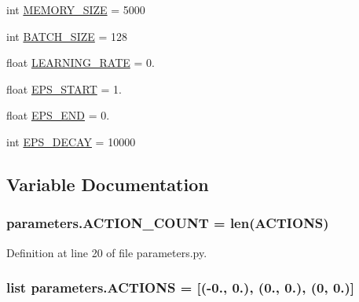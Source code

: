 \begin{DoxyCompactItemize}
\item 
int \hyperlink{namespaceparameters_a49f1ad074b5710a98fc783c5627ddade}{M\+E\+M\+O\+R\+Y\+\_\+\+S\+I\+ZE} = 5000
\item 
int \hyperlink{namespaceparameters_a2d37d9950f7a887014021ab455282af6}{B\+A\+T\+C\+H\+\_\+\+S\+I\+ZE} = 128
\item 
float \hyperlink{namespaceparameters_afb996d542e8c3d3e8bbdfe4a711694dd}{L\+E\+A\+R\+N\+I\+N\+G\+\_\+\+R\+A\+TE} = 0.
\item 
float \hyperlink{namespaceparameters_a371d0de003e9046dcc72450b7512ce14}{E\+P\+S\+\_\+\+S\+T\+A\+RT} = 1.
\item 
float \hyperlink{namespaceparameters_a3765f189d3af4815766ded3bffcba1e2}{E\+P\+S\+\_\+\+E\+ND} = 0.
\item 
int \hyperlink{namespaceparameters_ab9a88c663385563b35331bbea5c4a74b}{E\+P\+S\+\_\+\+D\+E\+C\+AY} = 10000
\end{DoxyCompactItemize}


\subsection{Variable Documentation}
\subsubsection[{\texorpdfstring{A\+C\+T\+I\+O\+N\+\_\+\+C\+O\+U\+NT}{ACTION_COUNT}}]{\setlength{\rightskip}{0pt plus 5cm}parameters.\+A\+C\+T\+I\+O\+N\+\_\+\+C\+O\+U\+NT = len({\bf A\+C\+T\+I\+O\+NS})}\hypertarget{namespaceparameters_ae4be13f6dac91f471da3efb4618a54c1}{}\label{namespaceparameters_ae4be13f6dac91f471da3efb4618a54c1}


Definition at line 20 of file parameters.\+py.

\subsubsection[{\texorpdfstring{A\+C\+T\+I\+O\+NS}{ACTIONS}}]{\setlength{\rightskip}{0pt plus 5cm}list parameters.\+A\+C\+T\+I\+O\+NS = \mbox{[}(-\/0., 0.), (0., 0.), (0, 0.)\mbox{]}}\hypertarget{namespaceparameters_a585a25d0a26bcab4242d2e3fb1c1f93e}{}\label{namespaceparameters_a585a25d0a26bcab4242d2e3fb1c1f93e}


